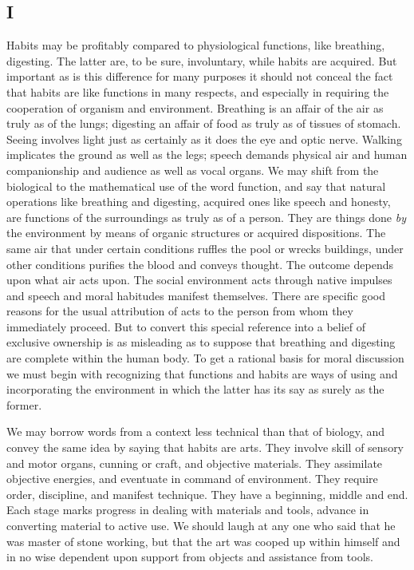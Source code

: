 \documentclass[12pt]{article}
\begin{document}
\subsection*{I}

Habits may be profitably compared to physiological
functions, like breathing, digesting. The latter are, to
be sure, involuntary, while habits are acquired. But
important as is this difference for many purposes it
should not conceal the fact that habits are like functions
in many respects, and especially in requiring the
cooperation of organism and environment. Breathing
is an affair of the air as truly as of the lungs; digesting
an affair of food as truly as of tissues of stomach.
Seeing involves light just as certainly as it does the
eye and optic nerve. Walking implicates the ground
as well as the legs; speech demands physical air and
human companionship and audience as well as vocal
organs. We may shift from the biological to the mathematical
use of the word function, and say that natural
operations like breathing and digesting, acquired ones
like speech and honesty, are functions of the surroundings
as truly as of a person. They are things done \emph{by}
the environment by means of organic structures or
acquired dispositions. The same air that under certain
conditions ruffles the pool or wrecks buildings,
under other conditions purifies the blood and conveys
thought. The outcome depends upon what air acts
upon. The social environment acts through native impulses
and speech and moral habitudes manifest themselves.
There are specific good reasons for the usual
attribution of acts to the person from whom they immediately
proceed. But to convert this special reference
into a belief of exclusive ownership is as misleading
as to suppose that breathing and digesting are
complete within the human body. To get a rational
basis for moral discussion we must begin with recognizing
that functions and habits are ways of using and
incorporating the environment in which the latter has
its say as surely as the former.

We may borrow words from a context less technical
than that of biology, and convey the same idea by saying
that habits are arts. They involve skill of sensory
and motor organs, cunning or craft, and objective
materials. They assimilate objective energies, and
eventuate in command of environment. They require
order, discipline, and manifest technique. They have
a beginning, middle and end. Each stage marks progress
in dealing with materials and tools, advance in converting
material to active use. We should laugh at any
one who said that he was master of stone working, but
that the art was cooped up within himself and in no wise
dependent upon support from objects and assistance
from tools.
\end{document}
